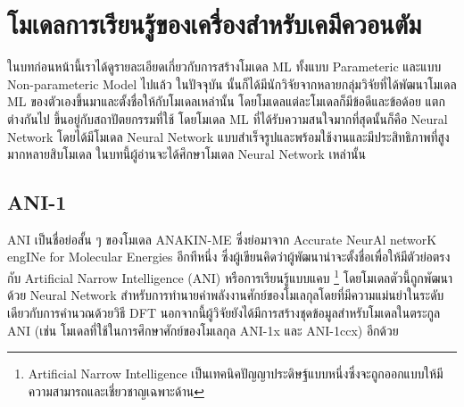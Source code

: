 

\chapter{โมเดลการเรียนรู้ของเครื่องสำหรับเคมีควอนตัม}
\label{ch:chem_ml}

ในบทก่อนหน้านี้เราได้ดูรายละเอียดเกี่ยวกับการสร้างโมเดล ML ทั้งแบบ Parameteric และแบบ Non-parameteric Model ไปแล้ว ในปัจจุบัน%
นั้นก็ได้มีนักวิจัยจากหลายกลุ่มวิจัยที่ได้พัฒนาโมเดล ML ของตัวเองขึ้นมาและตั้งชื่อให้กับโมเดลเหล่านั้น โดยโมเดลแต่ละโมเดลก็มีข้อดีและข้อด้อย%
แตกต่างกันไป ขึ้นอยู่กับสถาปัตยกรรมที่ใช้ โดยโมเดล ML ที่ได้รับความสนใจมากที่สุดนั้นก็คือ Neural Network โดยได้มีโมเดล Neural Network 
แบบสำเร็จรูปและพร้อมใช้งานและมีประสิทธิภาพที่สูงมากหลายสิบโมเดล ในบทนี้ผู้อ่านจะได้ศึกษาโมเดล Neural Network เหล่านั้น

\section{ANI-1}
\label{sec:ani1}

ANI เป็นชื่อย่อสั้น ๆ ของโมเดล ANAKIN-ME ซึ่งย่อมาจาก Accurate NeurAl networK engINe for Molecular Energies อีกทีหนึ่ง 
ซึ่งผู้เขียนคิดว่าผู้พัฒนาน่าจะตั้งชื่อเพื่อให้มีตัวย่อตรงกับ Artificial Narrow Intelligence (ANI) หรือการเรียนรู้แบบแคบ%
\footnote{Artificial Narrow Intelligence เป็นเทคนิคปัญญาประดิษฐ์แบบหนึ่งซึ่งจะถูกออกแบบให้มีความสามารถและเชี่ยวชาญเฉพาะด้าน}
โดยโมเดลตัวนี้ถูกพัฒนาด้วย Neural Network สำหรับการทำนายค่าพลังงานศักย์ของโมเลกุลโดยที่มีความแม่นยำในระดับเดียวกับการคำนวณด้วยวิธี 
DFT\autocite{smith2017} นอกจากนี้ผู้วิจัยยังได้มีการสร้างชุดข้อมูลสำหรับโมเดลในตระกูล ANI (เช่น โมเดลที่ใช้ในการศึกษาศักย์ของโมเลกุล 
ANI-1x และ ANI-1ccx) อีกด้วย\autocite{smith2020}

